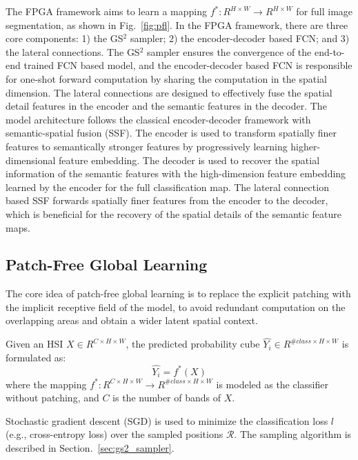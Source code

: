 \documentclass[journal]{IEEEtran}
\begin{document}
The FPGA framework aims to learn a mapping $f^*: R^{H\times W} \rightarrow R^{H\times W}$ for full image segmentation, as shown in Fig.~\ref{fig:pfl}.
In the FPGA framework, there are three core components: 1) the GS$^2$ sampler; 2) the encoder-decoder based FCN; and 3) the lateral connections.
The GS$^2$ sampler ensures the convergence of the end-to-end trained FCN based model, and the encoder-decoder based FCN is responsible for one-shot forward computation by sharing the computation in the spatial dimension.
The lateral connections are designed to effectively fuse the spatial detail features in the encoder and the semantic features in the decoder.
The model architecture follows the classical encoder-decoder framework \cite{long2015fully, ronneberger2015u, badrinarayanan2017segnet, chen2017deeplab} with semantic-spatial fusion (SSF).
The encoder is used to transform spatially finer features to semantically stronger features by progressively learning higher-dimensional feature embedding.
The decoder is used to recover the spatial information of the semantic features with the high-dimension feature embedding learned by the encoder for the full classification map.
The lateral connection based SSF forwards spatially finer features from the encoder to the decoder, which is beneficial for the recovery of the spatial details of the semantic feature maps.


\subsection{Patch-Free Global Learning}
The core idea of patch-free global learning is to replace the explicit patching with the implicit receptive field of the model, to avoid redundant computation on the overlapping areas and obtain a wider latent spatial context.

Given an HSI $X \in R^{C\times H\times W}$, the predicted probability cube $\hat{Y_i} \in R^{\#class\times H\times W}$ is formulated as:
\begin{equation}
  \hat{Y_i} = f^*(X)
\end{equation}
where the mapping $f^*: R^{C\times H\times W} \rightarrow R^{\#class\times H\times W}$ is modeled as the classifier without patching, and $C$ is the number of bands of $X$.

Stochastic gradient descent (SGD) \cite{robbins1951stochastic} is used to minimize the classification loss $l$ (e.g., cross-entropy loss) over the sampled positions $\mathcal{R}$.
The sampling algorithm is described in Section.~\ref{sec:gs2_sampler}.
\end{document}

